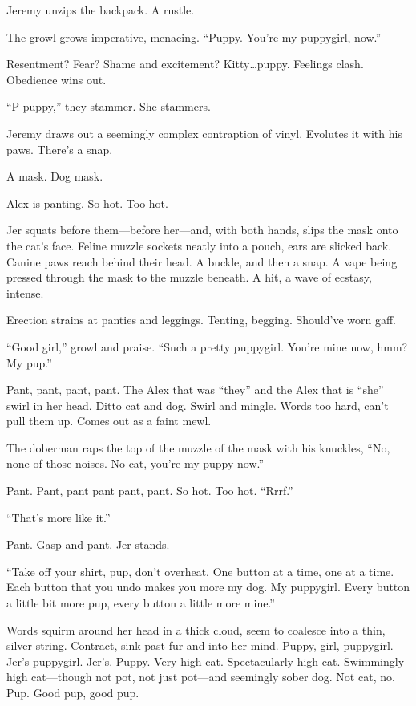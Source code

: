 Jeremy unzips the backpack. A rustle.

The growl grows imperative, menacing. ``Puppy. You're my puppygirl, now.''

Resentment? Fear? Shame and excitement? Kitty\ldots{}puppy. Feelings clash. Obedience wins out.

``P-puppy,'' they stammer. She stammers.

Jeremy draws out a seemingly complex contraption of vinyl. Evolutes it with his paws. There's a snap.

A mask. Dog mask.

Alex is panting. So hot. Too hot.

Jer squats before them---before her---and, with both hands, slips the mask onto the cat's face. Feline muzzle sockets neatly into a pouch, ears are slicked back. Canine paws reach behind their head. A buckle, and then a snap. A vape being pressed through the mask to the muzzle beneath. A hit, a wave of ecstasy, intense.

Erection strains at panties and leggings. Tenting, begging. Should've worn gaff.

``Good girl,'' growl and praise. ``Such a pretty puppygirl. You're mine now, hmm? My pup.''

Pant, pant, pant, pant. The Alex that was ``they'' and the Alex that is ``she'' swirl in her head. Ditto cat and dog. Swirl and mingle. Words too hard, can't pull them up. Comes out as a faint mewl.

The doberman raps the top of the muzzle of the mask with his knuckles, ``No, none of those noises. No cat, you're my puppy now.''

Pant. Pant, pant pant pant, pant. So hot. Too hot. ``Rrrf.''

``That's more like it.''

Pant. Gasp and pant. Jer stands.

``Take off your shirt, pup, don't overheat. One button at a time, one at a time. Each button that you undo makes you more my dog. My puppygirl. Every button a little bit more pup, every button a little more mine.''

Words squirm around her head in a thick cloud, seem to coalesce into a thin, silver string. Contract, sink past fur and into her mind. Puppy, girl, puppygirl. Jer's puppygirl. Jer's. Puppy. Very high cat. Spectacularly high cat. Swimmingly high cat---though not pot, not just pot---and seemingly sober dog. Not cat, no. Pup. Good pup, good pup.

